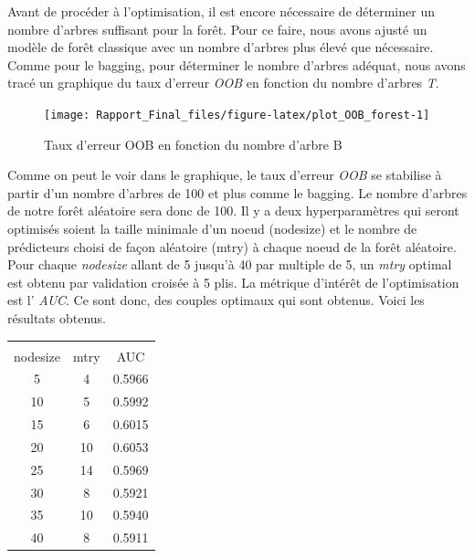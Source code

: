 \documentclass[]{article}
\begin{document}
Avant de procéder à l'optimisation, il est encore nécessaire de
déterminer un nombre d'arbres suffisant pour la forêt. Pour ce faire,
nous avons ajusté un modèle de forêt classique avec un nombre d'arbres
plus élevé que nécessaire. Comme pour le bagging, pour déterminer le
nombre d'arbres adéquat, nous avons tracé un graphique du taux d'erreur
\emph{OOB} en fonction du nombre d'arbres \emph{T}.

\begin{figure}

{\centering \texttt{[image: Rapport\_Final\_files/figure-latex/plot\_OOB\_forest-1]} 

}

\caption{Taux d'erreur OOB en fonction du nombre d'arbre B}\label{fig:plot_OOB_forest}
\end{figure}

\newpage

Comme on peut le voir dans le graphique, le taux d'erreur \emph{OOB} se
stabilise à partir d'un nombre d'arbres de 100 et plus comme le bagging.
Le nombre d'arbres de notre forêt aléatoire sera donc de 100. Il y a
deux hyperparamètres qui seront optimisés soient la taille minimale d'un
noeud (nodesize) et le nombre de prédicteurs choisi de façon aléatoire
(mtry) à chaque noeud de la forêt aléatoire. Pour chaque \emph{nodesize}
allant de 5 jusqu'à 40 par multiple de 5, un \emph{mtry} optimal est
obtenu par validation croisée à 5 plis. La métrique d'intérêt de
l'optimisation est l' \emph{AUC}. Ce sont donc, des couples optimaux qui
sont obtenus. Voici les résultats obtenus.

\begin{table}[!ht]
\centering
\begin{tabular}{ccc}
\hline
\multicolumn{3}{c}{} \\
nodesize & mtry & AUC \\ 
  \hline
5 & 4 & 0.5966 \\ 
  10 & 5 & 0.5992 \\ 
  15 & 6 & 0.6015 \\ 
   \hline
20 & 10 & 0.6053 \\ 
   \hline
25 & 14 & 0.5969 \\ 
  30 & 8 & 0.5921 \\ 
  35 & 10 & 0.5940 \\ 
  40 & 8 & 0.5911 \\ 
   \hline
\end{tabular}
\end{table}
\end{document}
